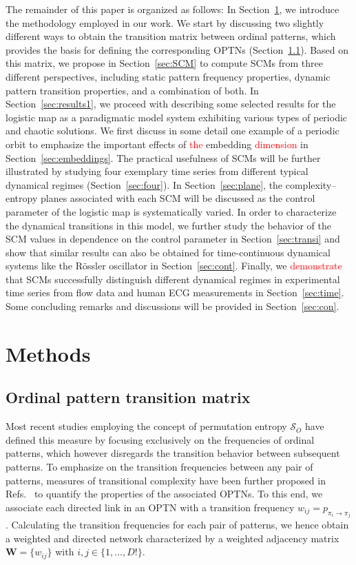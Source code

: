 \documentclass[aip,cha,reprint,nofootinbib]{revtex4-1}
\begin{document}
The remainder of this paper is organized as follows: In Section~\ref{sec:methods}, we introduce the methodology employed in our work. We start by discussing two slightly different ways to obtain the transition matrix between ordinal patterns, which provides the basis for defining the corresponding OPTNs (Section~\ref{sec:OPW}). Based on this matrix, we propose in Section~\ref{sec:SCM} to compute SCMs from three different perspectives, including static pattern frequency properties, dynamic pattern transition properties, and a combination of both. In Section~\ref{sec:results1}, we proceed with describing some selected results for the logistic map as a paradigmatic model system exhibiting various types of periodic and chaotic solutions. We first discuss in some detail one example of a periodic orbit to emphasize the important effects of \textcolor{red}{the} embedding \textcolor{red}{dimension} in Section~\ref{sec:embeddings}. The practical usefulness of SCMs will be further illustrated by studying four exemplary time series from different typical dynamical regimes (Section~\ref{sec:four}). In Section~\ref{sec:plane}, the complexity--entropy planes associated with each SCM will be discussed as the control parameter of the logistic map is systematically varied. In order to characterize the dynamical transitions in this model, we further study the behavior of the SCM values in dependence on the control parameter in Section~\ref{sec:transi} and show that similar results can also be obtained for time-continuous dynamical systems like the R\"ossler oscillator in Section~\ref{sec:cont}. Finally, we \textcolor{red}{demonstrate} that SCMs successfully distinguish different dynamical regimes in experimental time series from flow data and human ECG measurements in Section~\ref{sec:time}. Some concluding remarks and discussions will be provided in Section~\ref{sec:con}.  

\section{Methods} \label{sec:methods}

\subsection{Ordinal pattern transition matrix} \label{sec:OPW}

Most recent studies employing the concept of permutation entropy $\mathcal{S}_O$ have defined this measure by focusing exclusively on the frequencies of ordinal patterns, which however disregards the transition behavior between subsequent patterns. To emphasize on the transition frequencies between any pair of patterns, measures of transitional complexity have been further proposed in Refs.~\cite{zhangSciRep2017,McCullough2017b} to quantify the properties of the associated OPTNs. To this end, we associate each directed link in an OPTN with a transition frequency $w_{ij} = p_{\pi_i \to \pi_j}$. Calculating the transition frequencies for each pair of patterns, we hence obtain a weighted and directed network characterized by a weighted adjacency matrix $\mathbf{W} = \{ w_{ij} \}$ with $i, j \in \{1,\ldots, D!\}$. 
\end{document}
